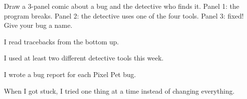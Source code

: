 \begin{creative}
Draw a 3-panel comic about a bug and the detective who finds it. Panel 1: the program breaks. Panel 2: the detective uses
one of the four tools. Panel 3: fixed! Give your bug a name.
\answerspace{4cm}
\end{creative}

\begin{selfcheck}
  \item I read tracebacks from the bottom up.
  \item I used at least two different detective tools this week.
  \item I wrote a bug report for each Pixel Pet bug.
  \item When I got stuck, I tried one thing at a time instead of changing everything.
\end{selfcheck}
